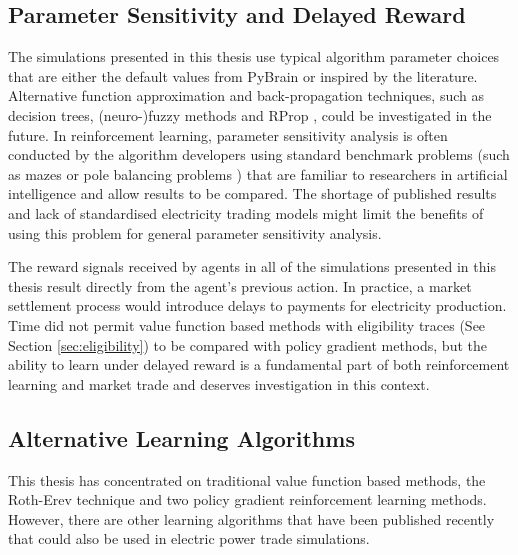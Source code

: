 \subsection{Parameter Sensitivity and Delayed Reward}
The simulations presented in this thesis use typical algorithm parameter choices
that are either the default values from PyBrain or inspired by the literature.
Alternative function approximation and back-propagation techniques, such as
decision trees, (neuro-)fuzzy methods \cite{jang93anfis} and RProp
\cite{riedmiller93}, could be investigated in the future. In reinforcement
learning, parameter sensitivity analysis is often conducted by the algorithm
developers using standard benchmark problems (such as mazes or pole balancing
problems \cite{schaul:2010}) that are familiar to researchers in artificial
intelligence and allow results to be compared. The shortage of published results
and lack of standardised electricity trading models might limit the benefits of
using this problem for general parameter sensitivity analysis.

The reward signals received by agents in all of the simulations presented in
this thesis result directly from the agent's previous action.  In
practice, a market settlement process would introduce delays to payments for
electricity production. Time did not permit value function based methods with
eligibility traces (See Section \ref{sec:eligibility}) to be compared with
policy gradient methods, but the ability to learn under delayed reward is a
fundamental part of both reinforcement learning and market trade and deserves
investigation in this context.


\subsection{Alternative Learning Algorithms}
This thesis has concentrated on traditional value function based methods, the
Roth-Erev technique and two policy gradient reinforcement learning methods.
However, there are other learning algorithms that have been published recently
that could also be used in electric power trade simulations.

